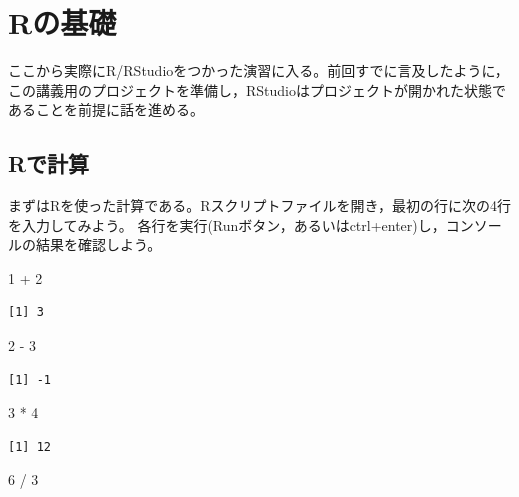 \documentclass[
  a4paper,
]{ltjsbook}
\newenvironment{Shaded}{\begin{snugshade}}{\end{snugshade}}
\newcommand{\DecValTok}[1]{\textcolor[rgb]{0.68,0.00,0.00}{#1}}
\newcommand{\SpecialCharTok}[1]{\textcolor[rgb]{0.37,0.37,0.37}{#1}}
\begin{document}

\chapter{Rの基礎}\label{sec-Rbase}

ここから実際にR/RStudioをつかった演習に入る。前回すでに言及したように，この講義用のプロジェクトを準備し，RStudioはプロジェクトが開かれた状態であることを前提に話を進める。

\section{Rで計算}\label{rux3067ux8a08ux7b97}

まずはRを使った計算である。Rスクリプトファイルを開き，最初の行に次の4行を入力してみよう。
各行を実行(Runボタン，あるいはctrl+enter)し，コンソールの結果を確認しよう。

\begin{Shaded}
\begin{Highlighting}[]
\DecValTok{1} \SpecialCharTok{+} \DecValTok{2}
\end{Highlighting}
\end{Shaded}

\begin{verbatim}
[1] 3
\end{verbatim}

\begin{Shaded}
\begin{Highlighting}[]
\DecValTok{2} \SpecialCharTok{{-}} \DecValTok{3}
\end{Highlighting}
\end{Shaded}

\begin{verbatim}
[1] -1
\end{verbatim}

\begin{Shaded}
\begin{Highlighting}[]
\DecValTok{3} \SpecialCharTok{*} \DecValTok{4}
\end{Highlighting}
\end{Shaded}

\begin{verbatim}
[1] 12
\end{verbatim}

\begin{Shaded}
\begin{Highlighting}[]
\DecValTok{6} \SpecialCharTok{/} \DecValTok{3}
\end{Highlighting}
\end{Shaded}
\end{document}
